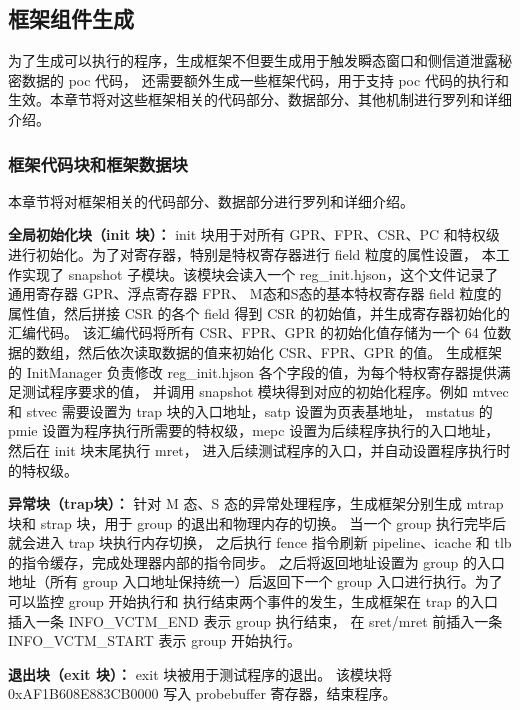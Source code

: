 \subsection{框架组件生成}

为了生成可以执行的程序，生成框架不但要生成用于触发瞬态窗口和侧信道泄露秘密数据的 poc 代码，
还需要额外生成一些框架代码，用于支持 poc 代码的执行和生效。本章节将对这些框架相关的代码部分、数据部分、其他机制进行罗列和详细介绍。\par

\subsubsection{框架代码块和框架数据块}
本章节将对框架相关的代码部分、数据部分进行罗列和详细介绍。

\textbf{全局初始化块（init 块）：}
init 块用于对所有 GPR、FPR、CSR、PC 和特权级进行初始化。为了对寄存器，特别是特权寄存器进行 field 粒度的属性设置，
本工作实现了 snapshot 子模块。该模块会读入一个 reg\_init.hjson，这个文件记录了通用寄存器 GPR、浮点寄存器 FPR、
M态和S态的基本特权寄存器 field 粒度的属性值，然后拼接 CSR 的各个 field 得到 CSR 的初始值，并生成寄存器初始化的汇编代码。
该汇编代码将所有 CSR、FPR、GPR 的初始化值存储为一个 64 位数据的数组，然后依次读取数据的值来初始化 CSR、FPR、GPR 的值。
生成框架的 InitManager 负责修改 reg\_init.hjson 各个字段的值，为每个特权寄存器提供满足测试程序要求的值，
并调用 snapshot 模块得到对应的初始化程序。例如 mtvec 和 stvec 需要设置为 trap 块的入口地址，satp 设置为页表基地址，
mstatus 的 pmie 设置为程序执行所需要的特权级，mepc 设置为后续程序执行的入口地址，然后在 init 块末尾执行 mret，
进入后续测试程序的入口，并自动设置程序执行时的特权级。\par

\textbf{异常块（trap块）：}
针对 M 态、S 态的异常处理程序，生成框架分别生成 mtrap 块和 strap 块，用于 group 的退出和物理内存的切换。
当一个 group 执行完毕后就会进入 trap 块执行内存切换，
之后执行 fence 指令刷新 pipeline、icache 和 tlb 的指令缓存，完成处理器内部的指令同步。
之后将返回地址设置为 group 的入口地址（所有 group 入口地址保持统一）后返回下一个 group 入口进行执行。为了可以监控 group 开始执行和
执行结束两个事件的发生，生成框架在 trap 的入口插入一条 INFO\_VCTM\_END 表示 group 执行结束，
在 sret/mret 前插入一条 INFO\_VCTM\_START 表示 group 开始执行。\par

\textbf{退出块（exit 块）：}
exit 块被用于测试程序的退出。
该模块将 0xAF1B608E883CB0000 写入 probebuffer 寄存器，结束程序。\par

